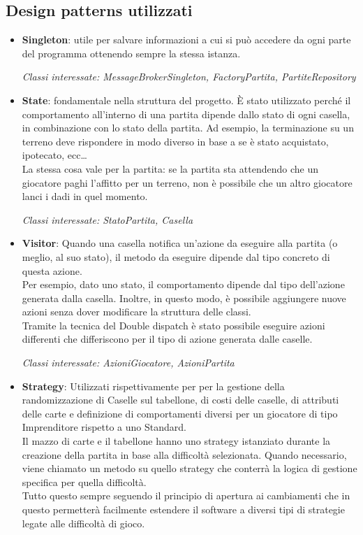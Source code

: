 \documentclass{article}
\begin{document}
\subsection{Design patterns utilizzati}
    \begin{itemize}
        \item \textbf{Singleton}: utile per salvare informazioni a cui si può accedere da ogni parte del programma ottenendo sempre la stessa istanza. 
        
        
        \textit{Classi interessate: MessageBrokerSingleton, FactoryPartita, PartiteRepository} 
        
        
        \item \textbf{State}: fondamentale nella struttura del progetto. È stato utilizzato perché il comportamento all'interno di una partita dipende dallo stato di ogni casella, in combinazione con lo stato della partita. Ad esempio, la terminazione su un terreno deve rispondere in modo diverso in base a se è stato acquistato, ipotecato, ecc… \\ La stessa cosa vale per la partita: se la partita sta attendendo che un giocatore paghi l'affitto per un terreno, non è possibile che un altro giocatore lanci i dadi in quel momento. 
        
        \textit{Classi interessate: StatoPartita, Casella} 
        
        
        \item \textbf{Visitor}: Quando una casella notifica un'azione da eseguire alla partita (o meglio, al suo stato), il metodo da eseguire dipende dal tipo concreto di questa azione. \\Per esempio, dato uno stato, il comportamento dipende dal tipo dell'azione generata dalla casella. Inoltre, in questo modo, è possibile aggiungere nuove azioni senza dover modificare la struttura delle classi.\\Tramite la tecnica del Double dispatch è stato possibile eseguire azioni differenti che differiscono per il tipo di azione generata dalle caselle.
        
        \textit{Classi interessate: AzioniGiocatore, AzioniPartita} 
        
        
        \item \textbf{Strategy}: Utilizzati rispettivamente per per la gestione della randomizzazione di Caselle sul tabellone, di costi delle caselle, di attributi delle carte e definizione di comportamenti diversi per un giocatore di tipo Imprenditore rispetto a uno Standard. 
        \\Il mazzo di carte e il tabellone hanno uno strategy istanziato durante la creazione della partita in base alla difficoltà selezionata. Quando necessario, viene chiamato un metodo su quello strategy che conterrà la logica di gestione specifica per quella difficoltà.
        \\Tutto questo sempre seguendo il principio di apertura ai cambiamenti che in questo permetterà facilmente estendere il software a diversi tipi di strategie legate alle difficoltà di gioco.
        

\end{itemize}
\end{document}
